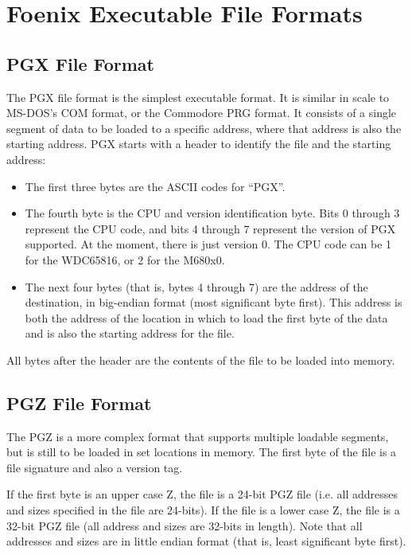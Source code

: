 \section{Foenix Executable File Formats}

\subsection*{PGX File Format}
The PGX file format is the simplest executable format. It is similar in scale to MS-DOS's COM format, or the Commodore PRG format.
It consists of a single segment of data to be loaded to a specific address, where that address is also the starting address.
PGX starts with a header to identify the file and the starting address:

\begin{itemize}
	\item The first three bytes are the ASCII codes for ``PGX''. 
    \item The fourth byte is the CPU and version identification byte.
	Bits 0 through 3 represent the CPU code, and bits 4 through 7 represent the version of PGX supported.
	At the moment, there is just version 0. The CPU code can be 1 for the WDC65816, or 2 for the M680x0.
    \item The next four bytes (that is, bytes 4 through 7) are the address of the destination, in big-endian format (most significant byte first).
	This address is both the address of the location in which to load the first byte of the data and is also the starting address for the file.
\end{itemize}

All bytes after the header are the contents of the file to be loaded into memory.

\subsection*{PGZ File Format}
The PGZ is a more complex format that supports multiple loadable segments, but is still to be loaded in set locations in memory.
The first byte of the file is a file signature and also a version tag.

If the first byte is an upper case Z, the file is a 24-bit PGZ file (i.e. all addresses and sizes specified in the file are 24-bits).
If the file is a lower case Z, the file is a 32-bit PGZ file (all address and sizes are 32-bits in length).
Note that all addresses and sizes are in little endian format (that is, least significant byte first).

